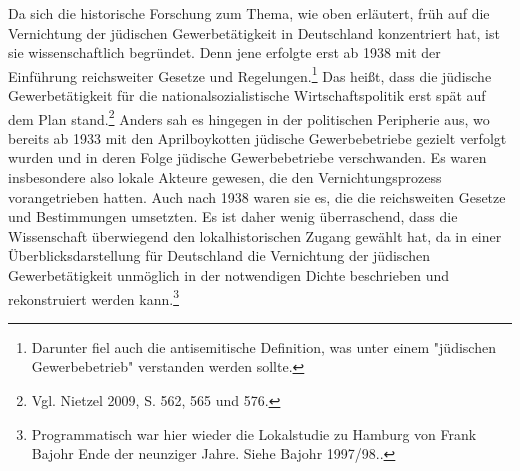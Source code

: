 Da sich die historische Forschung zum Thema, wie oben erläutert, früh auf die Vernichtung der jüdischen Gewerbetätigkeit in Deutschland konzentriert hat, ist sie wissenschaftlich begründet. Denn jene erfolgte erst ab 1938 mit der Einführung reichsweiter Gesetze und Regelungen.\footnote{Darunter fiel auch die antisemitische Definition, was unter einem "jüdischen Gewerbebetrieb" verstanden werden sollte.} Das heißt, dass die jüdische Gewerbetätigkeit für die nationalsozialistische Wirtschaftspolitik erst spät auf dem Plan stand.\footnote{Vgl. Nietzel 2009, S. 562, 565 und 576.} Anders sah es hingegen in der politischen Peripherie aus, wo bereits ab 1933 mit den Aprilboykotten jüdische Gewerbebetriebe gezielt verfolgt wurden und in deren Folge jüdische Gewerbebetriebe verschwanden. Es waren insbesondere also lokale Akteure gewesen, die den Vernichtungsprozess vorangetrieben hatten. Auch nach 1938 waren sie es, die die reichsweiten Gesetze und Bestimmungen umsetzten. Es ist daher wenig überraschend, dass die Wissenschaft überwiegend den lokalhistorischen Zugang gewählt hat, da in einer Überblicksdarstellung für Deutschland die Vernichtung der jüdischen Gewerbetätigkeit unmöglich in der notwendigen Dichte beschrieben und rekonstruiert werden kann.\footnote{Programmatisch war hier wieder die Lokalstudie zu Hamburg von Frank Bajohr Ende der neunziger Jahre. Siehe Bajohr 1997/98..} 

